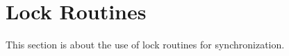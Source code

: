 \pagebreak
\section{Lock Routines}
\label{sec:locks}

This section is about the use of lock routines for synchronization.
